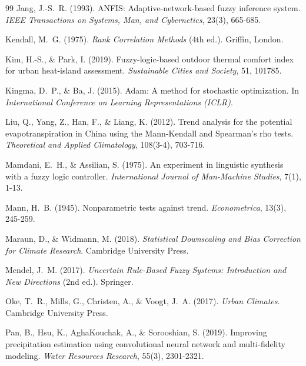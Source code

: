 \documentclass[conference]{IEEEtran}
\begin{document}
\begin{thebibliography}{99}
Jang, J.-S.~R. (1993).
\newblock ANFIS: Adaptive-network-based fuzzy inference system.
\newblock \textit{IEEE Transactions on Systems, Man, and Cybernetics},
23(3), 665-685.

Kendall, M.~G. (1975).
\newblock \textit{Rank Correlation Methods} (4th ed.).
\newblock Griffin, London.

Kim, H.-S., \& Park, I. (2019).
\newblock Fuzzy-logic-based outdoor thermal comfort index for urban
heat-island assessment.
\newblock \textit{Sustainable Cities and Society}, 51, 101785.

Kingma, D.~P., \& Ba, J. (2015).
\newblock Adam: A method for stochastic optimization.
\newblock In \textit{International Conference on Learning Representations
(ICLR)}.

Liu, Q., Yang, Z., Han, F., \& Liang, K. (2012).
\newblock Trend analysis for the potential evapotranspiration in China
using the Mann-Kendall and Spearman's rho tests.
\newblock \textit{Theoretical and Applied Climatology}, 108(3-4),
703-716.

Mamdani, E.~H., \& Assilian, S. (1975).
\newblock An experiment in linguistic synthesis with a fuzzy logic
controller.
\newblock \textit{International Journal of Man-Machine Studies},
7(1), 1-13.

Mann, H.~B. (1945).
\newblock Nonparametric tests against trend.
\newblock \textit{Econometrica}, 13(3), 245-259.

Maraun, D., \& Widmann, M. (2018).
\newblock \textit{Statistical Downscaling and Bias Correction for Climate
Research}.
\newblock Cambridge University Press.

Mendel, J.~M. (2017).
\newblock \textit{Uncertain Rule-Based Fuzzy Systems: Introduction and
New Directions} (2nd ed.).
\newblock Springer.

Oke, T.~R., Mills, G., Christen, A., \& Voogt, J.~A. (2017).
\newblock \textit{Urban Climates}.
\newblock Cambridge University Press.

Pan, B., Hsu, K., AghaKouchak, A., \& Sorooshian, S. (2019).
\newblock Improving precipitation estimation using convolutional neural
network and multi-fidelity modeling.
\newblock \textit{Water Resources Research}, 55(3), 2301-2321.


\end{thebibliography}
\end{document}

